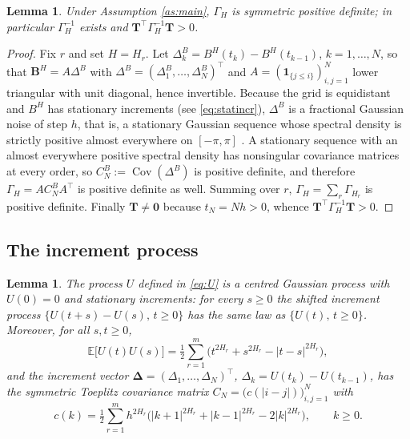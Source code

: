 \documentclass[11pt,reqno]{amsart}
\numberwithin{equation}{section}
\theoremstyle{plain}
\newtheorem{lemma}[theorem]{Lemma}
\theoremstyle{definition}
\theoremstyle{remark}
\newcommand{\bT}{\mathbf{T}}
\newcommand{\bB}{\mathbf{B}}
\newcommand{\bDelta}{\boldsymbol{\Delta}}
\newcommand{\bze}{\mathbf{0}}
\newcommand{\GH}{\Gamma_H}
\newcommand{\E}{\mathbb{E}}
\DeclareMathOperator{\Cov}{Cov}
\begin{document}
\begin{lemma}\label{le:nondeg}
Under Assumption \ref{as:main}, $\GH$ is symmetric positive definite; in particular
$\GH^{-1}$ exists and $\bT^{\top}\GH^{-1}\bT>0$.
\end{lemma}

\begin{proof}
Fix $r$ and set $H=H_r$. Let $\Delta^{B}_k=B^{H}(t_k)-B^{H}(t_{k-1})$, $k=1,\dots,N$, so
that $\bB^{H}=A\Delta^{B}$ with $\Delta^{B}=(\Delta^{B}_1,\dots,\Delta^{B}_N)^{\top}$ and
$A=(\mathbf 1_{\{j\le i\}})_{i,j=1}^{N}$ lower triangular with unit diagonal, hence
invertible. Because the grid is equidistant and $B^{H}$ has stationary increments
(see \eqref{eq:statincr}), $\Delta^{B}$ is a fractional Gaussian noise of step $h$, that
is, a stationary Gaussian sequence whose spectral density is strictly positive almost
everywhere on $[-\pi,\pi]$ \cite[Ch.~1]{Mis08}. A stationary sequence with an almost
everywhere positive spectral density has nonsingular covariance matrices at every order,
so $C^{B}_N:=\Cov(\Delta^{B})$ is positive definite, and therefore
$\Gamma_{H}=AC^{B}_NA^{\top}$ is positive definite as well. Summing over $r$,
$\GH=\sum_r\Gamma_{H_r}$ is positive definite. Finally $\bT\ne\bze$ because
$t_N=Nh>0$, whence $\bT^{\top}\GH^{-1}\bT>0$.
\end{proof}

\subsection{The increment process}

\begin{lemma}\label{le:statincr}
The process $U$ defined in \eqref{eq:U} is a centred Gaussian process with $U(0)=0$ and
stationary increments: for every $s\ge0$ the shifted increment process
$\{U(t+s)-U(s),\,t\ge0\}$ has the same law as $\{U(t),\,t\ge0\}$. Moreover, for all
$s,t\ge0$,
\begin{equation}\label{eq:Ucov}
  \E\bigl[U(t)U(s)\bigr]
  =\tfrac12\sum_{r=1}^{m}\bigl(t^{2H_r}+s^{2H_r}-|t-s|^{2H_r}\bigr),
\end{equation}
and the increment vector $\bDelta=(\Delta_1,\dots,\Delta_N)^{\top}$,
$\Delta_k=U(t_k)-U(t_{k-1})$, has the symmetric Toeplitz covariance matrix
$C_N=\bigl(c(|i-j|)\bigr)_{i,j=1}^{N}$ with
\begin{equation}\label{eq:CN}
  c(k)=\tfrac12\sum_{r=1}^{m}h^{2H_r}
       \bigl(|k+1|^{2H_r}+|k-1|^{2H_r}-2|k|^{2H_r}\bigr),\qquad k\ge0 .
\end{equation}
\end{lemma}
\end{document}
